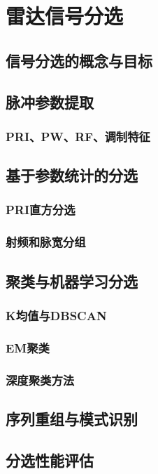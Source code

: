 \chapter{雷达信号分选}
\section{信号分选的概念与目标}
\section{脉冲参数提取}
\subsection{PRI、PW、RF、调制特征}
\section{基于参数统计的分选}
\subsection{PRI直方分选}
\subsection{射频和脉宽分组}
\section{聚类与机器学习分选}
\subsection{K均值与DBSCAN}
\subsection{EM聚类}
\subsection{深度聚类方法}
\section{序列重组与模式识别}
\section{分选性能评估}